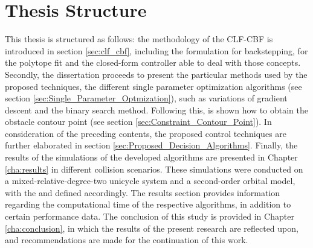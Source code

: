 
\section{Thesis Structure}
\label{sec:Thesis_Structure}

This thesis is structured as follows: the methodology of the CLF-CBF is introduced in section \ref{sec:clf_cbf}, including the formulation for backstepping, for the polytope fit and the closed-form controller able to deal with those concepts. Secondly, the dissertation proceeds to present the particular methods used by the proposed techniques, the different single parameter optimization algorithms (see section \ref{sec:Single_Parameter_Optmization}), such as variations of gradient descent and the binary search method. Following this, is shown how to obtain the obstacle contour point (see section \ref{sec:Constraint_Contour_Point}). In consideration of the preceding contents, the proposed control techniques are further elaborated in section \ref{sec:Proposed_Decision_Algorithms}. Finally, the results of the simulations of the developed algorithms are presented in Chapter \ref{cha:results} in different collision scenarios. These simulations were conducted on a mixed-relative-degree-two unicycle system and a second-order orbital model, with the  and  defined accordingly. The results section provides information regarding the computational time of the respective algorithms, in addition to certain performance data. The conclusion of this study is provided in Chapter \ref{cha:conclusion}, in which the results of the present research are reflected upon, and recommendations are made for the continuation of this work.
